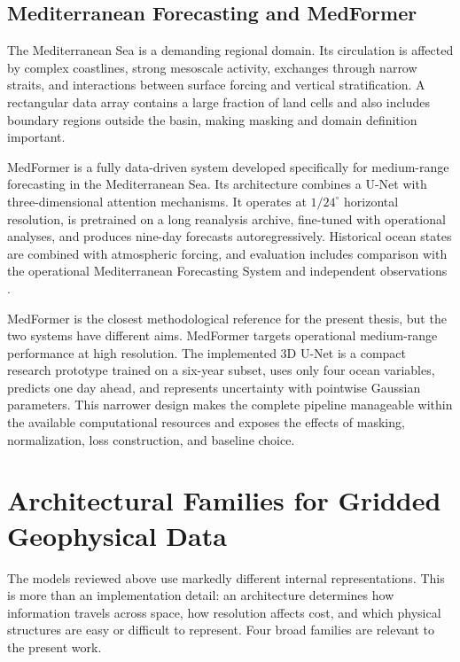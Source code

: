 \subsection{Mediterranean Forecasting and MedFormer}

The Mediterranean Sea is a demanding regional domain. Its circulation is affected by complex coastlines, strong mesoscale activity, exchanges through narrow straits, and interactions between surface forcing and vertical stratification. A rectangular data array contains a large fraction of land cells and also includes boundary regions outside the basin, making masking and domain definition important.

MedFormer is a fully data-driven system developed specifically for medium-range forecasting in the Mediterranean Sea. Its architecture combines a U-Net with three-dimensional attention mechanisms. It operates at $1/24^{\circ}$ horizontal resolution, is pretrained on a long reanalysis archive, fine-tuned with operational analyses, and produces nine-day forecasts autoregressively. Historical ocean states are combined with atmospheric forcing, and evaluation includes comparison with the operational Mediterranean Forecasting System and independent observations \citep{epicoco2026medformer}.

MedFormer is the closest methodological reference for the present thesis, but the two systems have different aims. MedFormer targets operational medium-range performance at high resolution. The implemented 3D U-Net is a compact research prototype trained on a six-year subset, uses only four ocean variables, predicts one day ahead, and represents uncertainty with pointwise Gaussian parameters. This narrower design makes the complete pipeline manageable within the available computational resources and exposes the effects of masking, normalization, loss construction, and baseline choice.

\section{Architectural Families for Gridded Geophysical Data}

The models reviewed above use markedly different internal representations. This is more than an implementation detail: an architecture determines how information travels across space, how resolution affects cost, and which physical structures are easy or difficult to represent. Four broad families are relevant to the present work.


